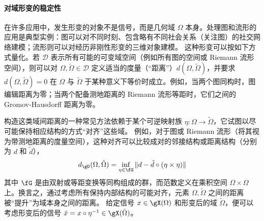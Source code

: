 \paragraph{对域形变的稳定性}
在许多应用中，发生形变的对象不是信号，而是几何域 $\Omega$ 本身。处理图和流形的应用是典型实例：图可以对不同时刻、包含略有不同社会关系（关注图）的社交网络建模；流形则可以对经历非刚性形变的三维对象建模。
这种形变可以按如下方式量化。若 $\mathcal{D}$ 表示所有可能的可变域空间（例如所有图的空间或 Riemann 流形空间），则可以对 $\Omega, \tilde{\Omega} \in \mathcal{D}$ 定义适当的度量（“距离”）$d(\Omega, \tilde{\Omega})$，并要求 $d(\Omega,\tilde{\Omega})=0$ 在 $\Omega$ 与 $\tilde{\Omega}$ 于某种意义下等价时成立。例如，当两个图同构时，图编辑距离为零；当两个配备测地距离的 Riemann 流形等距时，它们之间的 Gromov-Hausdorff 距离为零。


构造这类域间距离的一种常见方法依赖于某个可逆映射族
$\eta: \Omega \to \tilde{\Omega}$，它试图以尽可能保持相应结构的方式“对齐”这些域。%
例如，对于图或 Riemann 流形（将其视为带测地距离的度量空间），这种对齐可以比较成对的邻接结构或距离结构（分别为 $d$ 和 $\tilde{d}$），%
%
$$d_{\gD}(\Omega, \tilde{\Omega}) =  \inf_{\eta \in \fG}\|d - \tilde{d}\circ (\eta \times \eta)\|$$
%
其中 $\fG$ 是由双射或等距变换等同构组成的群，而范数定义在乘积空间 $\Omega \times \Omega$ 上。换言之，通过考虑所有保持内部结构的可能对齐，元素 $\Omega,\tilde{\Omega}$ 之间的距离被“提升”为域本身之间的距离。
给定信号 $x \in \gX(\Omega)$ 和形变后的域 $\tilde{\Omega}$，便可以考虑形变后的信号 $\tilde{x} = x \circ \eta^{-1} \in \gX(\tilde{\Omega})$。

